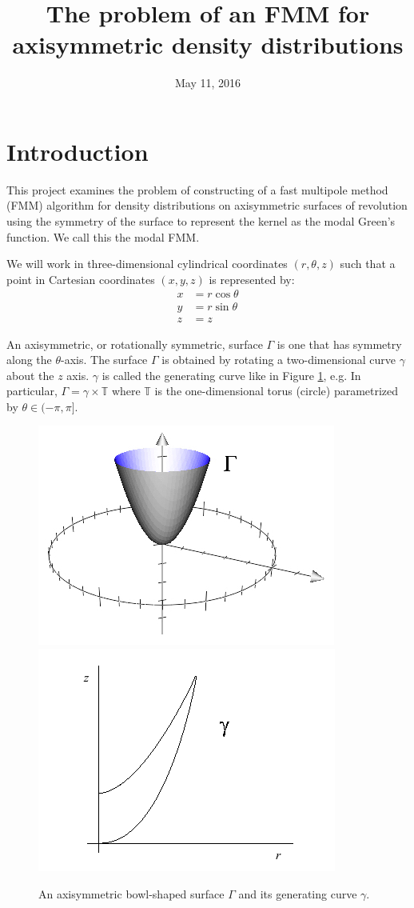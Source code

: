 \documentclass[11pt, oneside]{article}   	%
\title{The problem of an FMM for\\axisymmetric density distributions}
\date{May 11, 2016}
\begin{document}
\maketitle

\section{Introduction}
This project examines the problem of constructing of a fast multipole method (FMM) algorithm for density distributions on axisymmetric surfaces of revolution using the symmetry of the surface to represent the kernel as the modal Green's function. We call this the modal FMM.

We will work in three-dimensional cylindrical coordinates $(r,\theta,z)$ such that a point in Cartesian coordinates $(x,y,z)$ is represented by:
\begin{align*}
x &= r\cos\theta\\
y &= r\sin\theta\\
z &= z
\end{align*}

An axisymmetric, or rotationally symmetric, surface $\Gamma$ is one that has symmetry along the $\theta$-axis. The surface $\Gamma$ is obtained by rotating a two-dimensional curve $\gamma$ about the $z$ axis. $\gamma$ is called the generating curve like in Figure \ref{fig:1}, e.g. In particular, $\Gamma=\gamma\times\mathbb{T}$ where $\mathbb{T}$ is the one-dimensional torus (circle) parametrized by $\theta\in(-\pi,\pi]$.

\begin{figure}[h]
\caption{An axisymmetric bowl-shaped surface $\Gamma$ and its generating curve $\gamma$.}
\label{fig:1}
\centering
\includegraphics[scale=0.5]{./images/bowl3}
\includegraphics[scale=0.5]{./images/bowl}
\end{figure}
\end{document}
